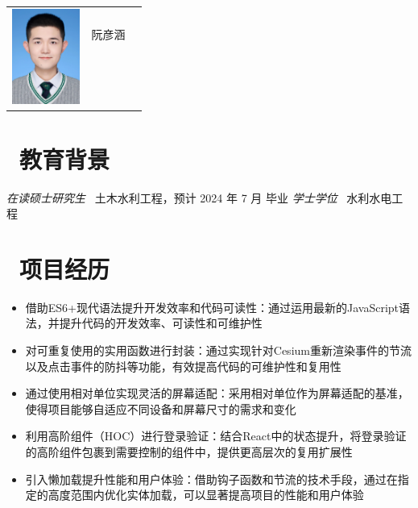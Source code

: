 \documentclass{resume}
\begin{document}

\Large{
  \begin{tabu}{ c l r }
    & \scshape{阮彦涵} &  \\
    &  &  \\
    &  &  \\
    &  &  \\
    &  & 
  \end{tabu}
}

\section{\faGraduationCap\ 教育背景}
\textit{在读硕士研究生} \  土木水利工程，预计 2024 年 7 月 毕业
\textit{学士学位} \ 水利水电工程 

\section{\faUsers\ 项目经历}
\begin{itemize}
  \item 借助ES6+现代语法提升开发效率和代码可读性：通过运用最新的JavaScript语法，并提升代码的开发效率、可读性和可维护性
  \item 对可重复使用的实用函数进行封装：通过实现针对Cesium重新渲染事件的节流以及点击事件的防抖等功能，有效提高代码的可维护性和复用性
  \item 通过使用相对单位实现灵活的屏幕适配：采用相对单位作为屏幕适配的基准，使得项目能够自适应不同设备和屏幕尺寸的需求和变化
  \item 利用高阶组件（HOC）进行登录验证：结合React中的状态提升，将登录验证的高阶组件包裹到需要控制的组件中，提供更高层次的复用扩展性
  \item 引入懒加载提升性能和用户体验：借助钩子函数和节流的技术手段，通过在指定的高度范围内优化实体加载，可以显著提高项目的性能和用户体验
\end{itemize}
\end{document}
